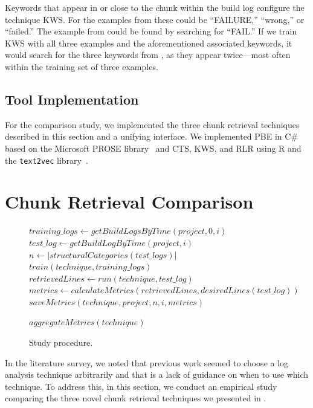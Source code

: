 \documentclass[10pt,journal,compsoc]{IEEEtran}
\begin{document}
Keywords that appear in or close to the chunk within
the build log configure the technique KWS\@.
For the examples from  these could be
``FAILURE,'' ``wrong,'' or ``failed.''
The example from  could be found
by searching for ``FAIL.''
If we train KWS with all three examples and the aforementioned
associated keywords, it would search for the three keywords from
, as they appear twice---most often within
the training set of three examples.

\subsection{Tool Implementation}
For the comparison study, we implemented the three chunk retrieval
techniques described in this section and a unifying interface.
We implemented PBE in C\# based on the Microsoft PROSE
library~\cite{prose2019webpage} and CTS, KWS, and RLR using
R and the {\tt text2vec} library~\cite{text2vec2019webpage}.

\section{Chunk Retrieval Comparison}
\label{sec:study}

\begin{figure}[tb]
\begin{algorithmic}[1]
   \State $training\_logs \gets getBuildLogsByTime(project, 0, i)$
   \State $test\_log \gets  getBuildLogByTime(project, i)$
   \State $n \gets |structuralCategories(test\_logs)|$
   \State
   \State $train(technique, training\_logs)$
       \State $retrievedLines \gets run(technique, test\_log)$
       \State $metrics \gets calculateMetrics(retrievedLines,
       desiredLines(test\_log))$
       \State
       \State $saveMetrics(technique, project, n, i, metrics)$

  \EndFor
 \EndFor
 \State $aggregateMetrics(technique)$
\EndFor
\end{algorithmic}

	\caption{Study procedure.}
	\label{fig:study}
\end{figure}


In the literature survey, we noted that previous work seemed to choose
a log analysis technique arbitrarily and that is a lack of guidance on
when to use which technique.
To address this, in this section, we conduct an empirical study
comparing the three novel chunk retrieval techniques we presented in
.
\end{document}

